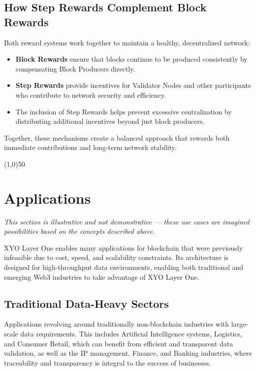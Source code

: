 \documentclass{article}
\begin{document}
\subsection{How Step Rewards Complement Block Rewards}

Both reward systems work together to maintain a healthy, decentralized network:
\begin{itemize}
    \item \textbf{Block Rewards} ensure that blocks continue to be produced consistently by compensating Block Producers directly.
    \item \textbf{Step Rewards} provide incentives for Validator Nodes and other participants who contribute to network security and efficiency.
    \item The inclusion of Step Rewards helps prevent excessive centralization by
          distributing additional incentives beyond just block producers.
\end{itemize}

Together, these mechanisms create a balanced approach that rewards both
immediate contributions and long-term network stability.

\begin{center}
\line(1,0){50}
\end{center}

\section{Applications}
\textit{This section is illustrative and not demonstrative — these use cases are imagined possibilities based on the concepts described above.}

XYO Layer One enables many applications for blockchain that were previously infeasible due to cost, speed, and scalability constraints. Its architecture is designed for high-throughput data environments, enabling both traditional and emerging Web3 industries to take advantage of XYO Layer One.

\subsection{Traditional Data-Heavy Sectors}
Applications revolving around traditionally non-blockchain industries with large-scale data requirements. This includes Artificial Intelligence systems, Logistics, and Consumer Retail, which can benefit from efficient and transparent data validation, as well as the IP management, Finance, and Banking industries, where traceability and transparency is integral to the success of businesses.
\end{document}
